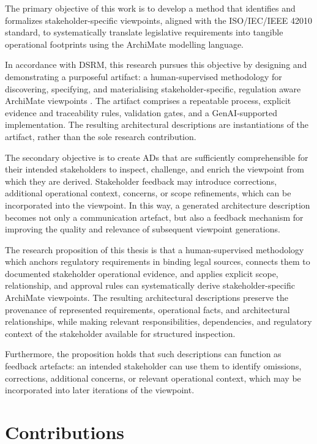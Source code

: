 The primary objective of this work is to develop a method that identifies and formalizes stakeholder-specific viewpoints, aligned with the ISO/IEC/IEEE 42010 standard, to systematically translate legislative requirements into tangible operational footprints using the ArchiMate modelling language. 

In accordance with \ac{DSRM}, this research pursues this objective by designing and demonstrating a purposeful artifact: a human-supervised methodology for discovering, specifying, and materialising stakeholder-specific, regulation aware ArchiMate viewpoints \cite{PeffersEtAl2007}. The artifact comprises a repeatable process, explicit evidence and traceability rules, validation gates, and a \ac{GenAI}-supported implementation. The resulting architectural descriptions are instantiations of the artifact, rather than the sole research contribution.

The secondary objective is to create \ac{AD}s that are sufficiently comprehensible for their intended stakeholders to inspect, challenge, and enrich the viewpoint from which they are derived. Stakeholder feedback may introduce corrections, additional operational context, concerns, or scope refinements, which can be incorporated into the viewpoint. In this way, a generated architecture description becomes not only a communication artefact, but also a feedback mechanism for improving the quality and relevance of subsequent viewpoint generations.

The research proposition of this thesis is that a human-supervised methodology which anchors regulatory requirements in binding legal sources, connects them to documented stakeholder operational evidence, and applies explicit scope, relationship, and approval rules can systematically derive stakeholder-specific ArchiMate viewpoints. The resulting architectural descriptions preserve the provenance of represented requirements, operational facts, and architectural relationships, while making relevant responsibilities, dependencies, and regulatory context of the stakeholder available for structured inspection.

Furthermore, the proposition holds that such descriptions can function as feedback artefacts: an intended stakeholder can use them to identify omissions, corrections, additional concerns, or relevant operational context, which may be incorporated into later iterations of the viewpoint.

\section{Contributions}

